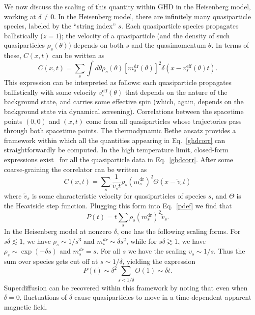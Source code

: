 \documentclass[
 reprint,
 superscriptaddress,
 amsmath,amssymb,
 aps,
 pra,
]{revtex4-2}
\begin{document}
We now discuss the scaling of this quantity within GHD in the Heisenberg model, working at $\delta \neq 0$. In the Heisenberg model, there are infinitely many quasiparticle species, labeled by the ``string index'' $s$. Each quasiparticle species propagates ballistically ($z = 1$); the velocity of a quasiparticle (and the density of such quasiparticles $\rho_s(\theta)$) depends on both $s$ and the quasimomentum $\theta$. In terms of these, $C(x,t)$ can be written as~\cite{Doyon2020}
%
\begin{equation}\label{ghdcorr}
C(x,t) = \sum_s \int d\theta \rho_s(\theta) [m_s^{\mathrm{dr}}(\theta)]^2 \delta(x - v_s^{\mathrm{eff}} (\theta) t).
\end{equation}
This expression can be interpreted as follows: each quasiparticle propagates ballistically with some velocity $v^{\mathrm{eff}}_s(\theta)$ that depends on the nature of the background state, and carries some effective spin (which, again, depends on the background state via dynamical screening). Correlations between the spacetime points $(0,0)$ and $(x,t)$ come from all quasiparticles whose trajectories pass through both spacetime points. The thermodynamic Bethe ansatz provides a framework within which all the quantities appearing in Eq.~\eqref{ghdcorr} can straightforwardly be computed. In the high temperature limit, closed-form expressions exist~\cite{Ilievski2018} for all the quasiparticle data in Eq.~\eqref{ghdcorr}. After some coarse-graining the correlator can be written as~\cite{Gopalakrishnan2019}
%
\begin{equation}
C(x,t) = \sum_s \frac{1}{\tilde v_s t} \rho_s (m_s^{\mathrm{dr}})^2 \Theta(x - \tilde v_s t)
\end{equation}
where $\tilde v_s$ is some characteristic velocity for quasiparticles of species $s$, and $\Theta$ is the Heaviside step function. Plugging this form into Eq.~\eqref{pdef} we find that
%
\begin{equation}\label{polsum}
P(t) = t \sum_s \rho_s (m_s^{\mathrm{dr}})^2 \tilde v_s.
\end{equation}
%
In the Heisenberg model at nonzero $\delta$, one has the following scaling forms. For $s \delta \lesssim 1$, we have $\rho_s \sim 1/s^3$ and $m_s^{dr} \sim \delta s^2$, while for $s \delta \gtrsim 1$, we have $\rho_s \sim \exp(-\delta s)$ and $m_s^{dr} = s$. For all $s$ we have the scaling $v_s \sim 1/s$. Thus the sum over species gets cut off at $s \sim 1/\delta$, yielding the expression
%
\begin{equation}
P(t) \sim \delta^2 \sum_{s < 1/\delta} O(1) \sim \delta t.
\end{equation}
%
Superdiffusion can be recovered within this framework by noting that even when $\delta = 0$, fluctuations of $\delta$ cause quasiparticles to move in a time-dependent apparent magnetic field.
\end{document}
